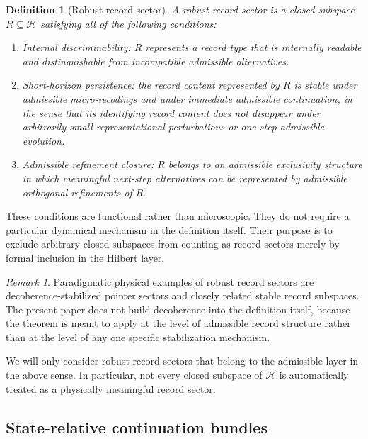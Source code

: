 \documentclass[11pt]{article}
\newtheorem{definition}{Definition}
\theoremstyle{remark}
\newtheorem{remark}{Remark}
\numberwithin{equation}{section}
\newcommand{\HH}{\mathcal{H}}
\begin{document}
\begin{definition}[Robust record sector]
\label{def:robust-record-sector}
A \emph{robust record sector} is a closed subspace $R \subseteq \HH$ satisfying all of the following conditions:
\begin{enumerate}[label=(\roman*)]
\item \emph{Internal discriminability}: $R$ represents a record type that is internally readable and distinguishable from incompatible admissible alternatives.
\item \emph{Short-horizon persistence}: the record content represented by $R$ is stable under admissible micro-recodings and under immediate admissible continuation, in the sense that its identifying record content does not disappear under arbitrarily small representational perturbations or one-step admissible evolution.
\item \emph{Admissible refinement closure}: $R$ belongs to an admissible exclusivity structure in which meaningful next-step alternatives can be represented by admissible orthogonal refinements of $R$.
\end{enumerate}
\end{definition}

These conditions are functional rather than microscopic. They do not require a particular dynamical mechanism in the definition itself. Their purpose is to exclude arbitrary closed subspaces from counting as record sectors merely by formal inclusion in the Hilbert layer.

\begin{remark}
Paradigmatic physical examples of robust record sectors are decoherence-stabilized pointer sectors and closely related stable record subspaces. The present paper does not build decoherence into the definition itself, because the theorem is meant to apply at the level of admissible record structure rather than at the level of any one specific stabilization mechanism.
\end{remark}

We will only consider robust record sectors that belong to the admissible layer in the above sense. In particular, not every closed subspace of $\HH$ is automatically treated as a physically meaningful record sector.

\subsection{State-relative continuation bundles}
\end{document}
